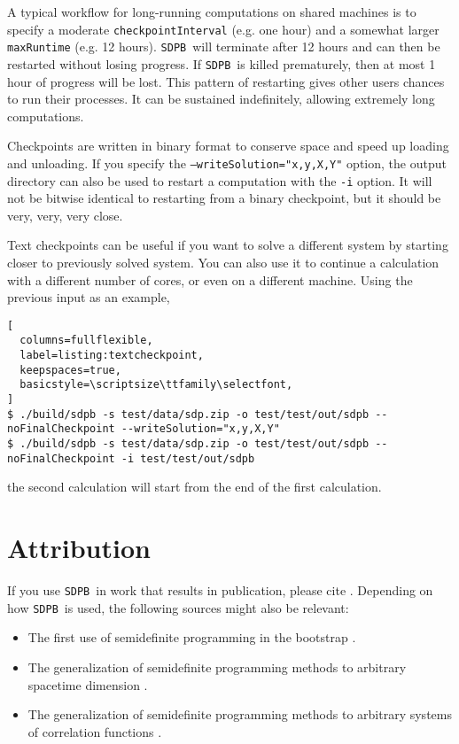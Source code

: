 \documentclass[12pt]{article}
\numberwithin{equation}{section}
\newcommand\SDPB{\texttt{SDPB}}
\begin{document}
A typical workflow for long-running computations on shared machines is to specify a moderate \texttt{checkpointInterval} (e.g. one hour) and a somewhat larger \texttt{maxRuntime} (e.g. 12 hours).  \SDPB\ will terminate after 12 hours and can then be restarted without losing progress.  If \SDPB\ is killed prematurely, then at most 1 hour of progress will be lost.  This pattern of restarting gives other users chances to run their processes.  It can be sustained indefinitely, allowing extremely long computations.

Checkpoints are written in binary format to conserve space and speed
up loading and unloading.  If you specify the \texttt{--writeSolution="x,y,X,Y"}
option, the output directory can also be used to restart a computation
with the \texttt{-i} option.  It will not be bitwise identical to
restarting from a binary checkpoint, but it should be very, very, very
close.

Text checkpoints can be useful if you want to solve a different system
by starting closer to previously solved system.  You can also use it
to continue a calculation with a different number of cores, or even on
a different machine.  Using the previous input as an example,

\begin{lstlisting}[
  columns=fullflexible,
  label=listing:textcheckpoint,
  keepspaces=true,
  basicstyle=\scriptsize\ttfamily\selectfont,
]
$ ./build/sdpb -s test/data/sdp.zip -o test/test/out/sdpb --noFinalCheckpoint --writeSolution="x,y,X,Y"
$ ./build/sdpb -s test/data/sdp.zip -o test/test/out/sdpb --noFinalCheckpoint -i test/test/out/sdpb
\end{lstlisting}
the second calculation will start from the end of the first calculation.

\section{Attribution}

If you use \SDPB\ in work that results in publication, please cite \cite{DSD}. Depending on how \SDPB\ is used, the following sources might also be relevant:
\begin{itemize}
\item The first use of semidefinite programming in the bootstrap \cite{Poland:2011ey}.
\item The generalization of semidefinite programming methods to arbitrary
spacetime dimension \cite{Kos:2013tga}.
\item The generalization of semidefinite programming methods to arbitrary
systems of correlation functions \cite{Kos:2014bka}.
\end{itemize}
\end{document}
